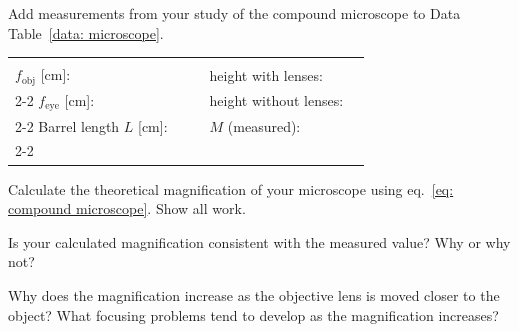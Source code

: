 \documentclass[addpoints]{physlabs}
\begin{document}
\begin{postlab}

    \pagebreak


        \filbreak
        \question[1] Add measurements from your study of the compound microscope to Data Table~\ref{data: microscope}.

        \begin{center}
            \renewcommand{\arraystretch}{2}
            \captionsetup{font=normalsize}
            \begin{tabular}{l>{\centering\arraybackslash}p{3cm}cl>{\centering\arraybackslash}p{3cm}}
                \hline
                & & & & \\
                $f_\text{obj}$ [cm]: & & & height with lenses: & \\
                \cline{2-2}\cline{5-5}
                $f_\text{eye}$ [cm]: & & & height without lenses: & \\
                \cline{2-2}\cline{5-5}
                Barrel length $L$ [cm]: & & & $M$ (measured): & \\
                \cline{2-2}\cline{5-5}
            \end{tabular}
        \end{center}
        \begin{solution}[1cm]   
        \end{solution}

        \filbreak
        \question[1] Calculate the theoretical magnification of your microscope using eq.~\ref{eq: compound microscope}. Show all work.
        \begin{solution}[3cm]   
        \end{solution}

        \filbreak
        \question[1] Is your calculated magnification consistent with the measured value? Why or why not?
        \begin{solution}[3cm]   
        \end{solution}

        \filbreak
        \question[1] Why does the magnification increase as the objective lens is moved closer to the object? What focusing problems tend to develop as the magnification increases?
        \begin{solution}[3cm]   
        \end{solution}


\end{postlab}
\end{document}

